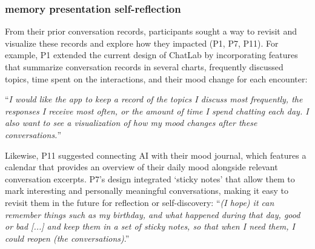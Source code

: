 
\subsubsection{ memory presentation  self-reflection}
From their prior conversation records, participants sought a way to revisit and visualize these records and explore how they impacted  (P1, P7, P11). For example, P1 extended the current design of ChatLab by incorporating features that summarize conversation records in several charts,  frequently discussed topics, time spent on the interactions, and their mood change for each encounter:

``\textit{I would like the app to keep a record of the topics I discuss most frequently, the responses I receive most often, or the amount of time I spend chatting each day. I also want to see a visualization of how my mood changes after these conversations.}'' 

Likewise, P11 suggested connecting AI with their mood journal, which features a calendar that provides an overview of their daily mood alongside relevant conversation excerpts.
P7's design integrated `sticky notes' that allow them to mark interesting and personally meaningful conversations, making it easy to revisit them in the future for reflection or self-discovery: 
``\textit{(I hope) it can remember things such as my birthday, and what happened during that day, good or bad [...] and keep them in a set of sticky notes, so that when I need them, I could reopen (the conversations)}.'' 


